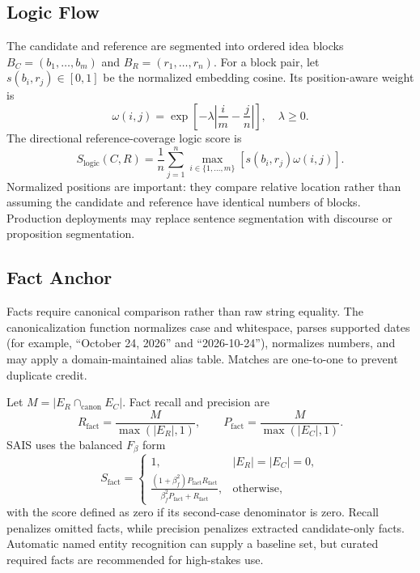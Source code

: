 \documentclass[11pt]{article}
\begin{document}
\subsection{Logic Flow}

The candidate and reference are segmented into ordered idea blocks
$B_C=(b_1,\ldots,b_m)$ and $B_R=(r_1,\ldots,r_n)$. For a block pair, let
$s(b_i,r_j)\in[0,1]$ be the normalized embedding cosine. Its position-aware
weight is
\begin{equation}
\omega(i,j)=\exp\left[-\lambda\left|\frac{i}{m}-\frac{j}{n}\right|\right],
\quad \lambda\geq0.
\end{equation}
The directional reference-coverage logic score is
\begin{equation}
S_{\mathrm{logic}}(C,R)=\frac{1}{n}\sum_{j=1}^{n}
\max_{i\in\{1,\ldots,m\}}\left[s(b_i,r_j)\omega(i,j)\right].
\label{eq:logic}
\end{equation}
Normalized positions are important: they compare relative location rather than
assuming the candidate and reference have identical numbers of blocks.
Production deployments may replace sentence segmentation with discourse or
proposition segmentation.

\subsection{Fact Anchor}

Facts require canonical comparison rather than raw string equality. The
canonicalization function normalizes case and whitespace, parses supported
dates (for example, ``October 24, 2026'' and ``2026-10-24''), normalizes
numbers, and may apply a domain-maintained alias table. Matches are one-to-one
to prevent duplicate credit.

Let $M=|E_R\cap_{\mathrm{canon}}E_C|$. Fact recall and precision are
\begin{equation}
R_{\mathrm{fact}}=\frac{M}{\max(|E_R|,1)},\qquad
P_{\mathrm{fact}}=\frac{M}{\max(|E_C|,1)}.
\end{equation}
SAIS uses the balanced $F_\beta$ form
\begin{equation}
S_{\mathrm{fact}}=
\begin{cases}
1, & |E_R|=|E_C|=0,\\
\frac{(1+\beta_f^2)P_{\mathrm{fact}}R_{\mathrm{fact}}}
{\beta_f^2P_{\mathrm{fact}}+R_{\mathrm{fact}}}, & \text{otherwise},
\end{cases}
\end{equation}
with the score defined as zero if its second-case denominator is zero.
Recall penalizes omitted facts, while precision penalizes extracted
candidate-only facts. Automatic named entity recognition can supply a
baseline set, but curated required facts are recommended for high-stakes use.
\end{document}
